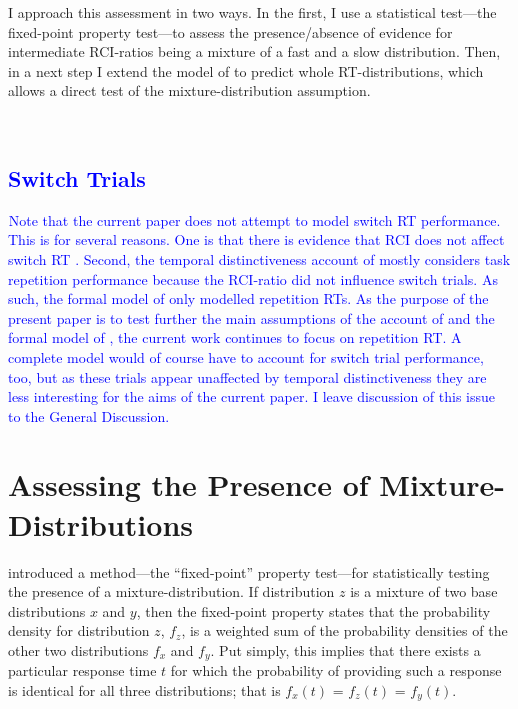 \documentclass[a4paper, man, natbib]{apa6}
\newcommand{\jg}[1]{\textcolor{blue}{$^{\textrm{}}${#1}}}
\begin{document}
I approach this assessment in two ways. In the first, I use a statistical test---the fixed-point property test---to assess the presence/absence of evidence for intermediate RCI-ratios being a mixture of a fast and a slow distribution. Then, in a next step I extend the model of \cite{Grange2015} to predict whole RT-distributions, which allows a direct test of the mixture-distribution assumption.

\jg{\subsection{Switch Trials}}
\jg{Note that the current paper does not attempt to model switch RT performance. This is for several reasons. One is that there is evidence that RCI does not affect switch RT \citep{Altmann2005, Horoufchin2011a, Meiran2000a}. Second, the temporal distinctiveness account of \cite{Horoufchin2011a} mostly considers task repetition performance because the RCI-ratio did not influence switch trials. As such, the formal model of \cite{Grange2015} only modelled repetition RTs. As the purpose of the present paper is to test further the main assumptions of the account of \cite{Horoufchin2011a} and the formal model of \cite{Grange2015}, the current work continues to focus on repetition RT. A complete model would of course have to account for switch trial performance, too, but as these trials appear unaffected by temporal distinctiveness they are less interesting for the aims of the current paper. I leave discussion of this issue to the General Discussion.}


\section{Assessing the Presence of Mixture-Distributions}
\cite{VanMaanen2014} introduced a method---the ``fixed-point'' property test---for statistically testing the presence of a mixture-distribution. If distribution $z$ is a mixture of two base distributions $x$ and $y$, then the fixed-point property states that the probability density for distribution $z$, $f_{z}$, is a weighted sum of the probability densities of the other two distributions $f_{x}$ and $f_{y}$. Put simply, this implies that there exists a particular response time $t$ for which the probability of providing such a response is identical for all three distributions; that is $f_{x}(t)$ = $f_{z}(t)$ = $f_{y}(t)$. 
\end{document}
